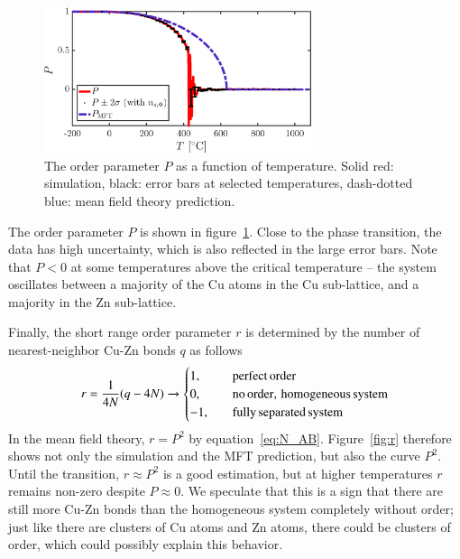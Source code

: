 \begin{figure}[!ht]
\begin{center}
  \includegraphics[width=0.7\textwidth]{../figures/P} 
  \caption{The order parameter $P$ as a function of temperature. Solid red: simulation, black: error bars at selected temperatures, dash-dotted blue: mean field theory prediction.}
  \label{fig:P}
\end{center}
\end{figure}

The order parameter $P$ is shown in figure~\ref{fig:P}. Close to the phase transition, the data has high uncertainty, which is also reflected in the large error bars. Note that $P <0$ at some temperatures above the critical temperature -- the system oscillates between a majority of the Cu atoms in the Cu sub-lattice, and a majority in the Zn sub-lattice.  

Finally, the short range order parameter $r$ is determined by the number of nearest-neighbor Cu-Zn bonds $q$ as follows
\begin{equation}
r = \frac{1}{4 N}(q-4N) \rightarrow \begin{cases}
1, \quad& {\rm perfect \, order} \\
0, \quad&  {\rm no \, order, \, homogeneous \, system}\\
-1, \quad& {\rm fully \, separated \, system}
\end{cases}
\end{equation}
In the mean field theory, $r = P^2$ by equation~\eqref{eq:N_AB}. Figure~\ref{fig:r} therefore shows not only the simulation and the MFT prediction, but also the curve $P^2$. Until the transition, $r \approx P^2$ is a good estimation, but at higher temperatures $r$ remains non-zero despite $P \approx 0$. We speculate that this is a sign that there are still more Cu-Zn bonds than the homogeneous system completely without order; just like there are clusters of Cu atoms and Zn atoms, there could be clusters of order, which could possibly explain this behavior. 

